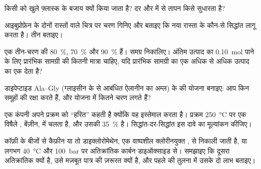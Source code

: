 \begin{exercise}[$\star\star$]\label{exo:g12:synthesis-strategy:10}
किसी  को खुले फ़्लास्क के बजाय  क्यों किया जाता है?
दर और  में से तापन किसे सुधारता है?
\end{exercise}

\begin{exercise}[$\star\star$]\label{exo:g12:synthesis-strategy:11}
आइबुप्रोफ़ेन के दोनों रास्तों वाले चित्र पर चरण गिनिए और बताइए कि नया
रास्ता  के कौन-से सिद्धांत लागू करता है। तीन बताइए।
\end{exercise}

\begin{exercise}[$\star\star\star$]\label{exo:g12:synthesis-strategy:12}
एक तीन-चरण  की  \qty{80}{\percent},
\qty{70}{\percent} और \qty{90}{\percent} हैं। समग्र  निकालिए।
अंतिम उत्पाद का \qty{0.10}{mol} पाने के लिए प्रारंभिक सामग्री की कितनी मात्रा
चाहिए, यदि प्रारंभिक सामग्री का एक  अधिक से अधिक उत्पाद का एक 
देता है?
\end{exercise}

\begin{exercise}[$\star\star\star$]\label{exo:g12:synthesis-strategy:13}
डाइपेप्टाइड Ala--Gly (ग्लाइसीन के  से आबंधित ऐलानीन का अम्ल) के
 की योजना बनाइए: आप किन समूहों की रक्षा करते हैं, और योजना में कितने चरण
लगते हैं?
\end{exercise}

\begin{exercise}[$\star\star\star$]\label{exo:g12:synthesis-strategy:14}
एक कंपनी अपने प्रक्रम को ``हरित'' कहती है क्योंकि वह  इस्तेमाल करता है।
प्रक्रम \qty{250}{\celsius} पर एक विषैले , बेंज़ीन, में चलता है, और उसकी
 \qty{35}{\percent} है। सिद्धांत-दर-सिद्धांत इस दावे का
मूल्यांकन कीजिए।
\end{exercise}

\begin{exercise}[$\star\star\star$]\label{exo:g12:synthesis-strategy:15}
कॉफ़ी के बीजों से कैफ़ीन या तो डाइक्लोरोमेथेन, एक
वाष्पशील क्लोरीनयुक्त , से निकाली जाती है, या लगभग
\qty{40}{\celsius} और \qty{100}{bar} पर अतिक्रांतिक कार्बन डाइऑक्साइड से। समझाइए कि दूसरा
अतिक्रांतिक क्यों है, उसे मज़बूत पात्र की ज़रूरत क्यों है, और पहले की तुलना में उसके
दो लाभ बताइए।
\end{exercise}

